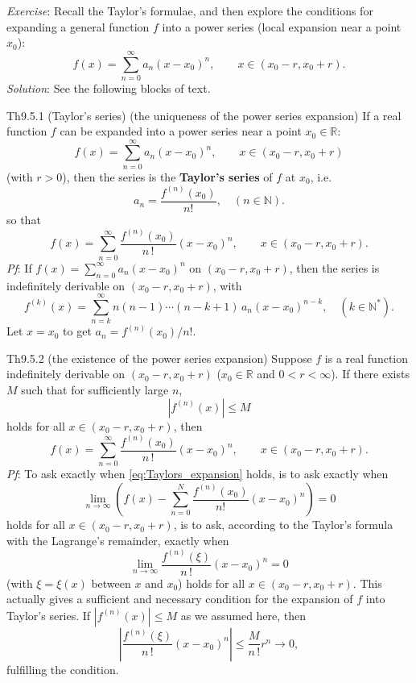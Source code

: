 \documentclass{article}
\begin{document}
\begin{Rmk}{}
    \textit{Exercise}: Recall the Taylor's formulae, and then explore the conditions for expanding a general function $f$ into a power series (local expansion near a point $x_0$):
    $$ f(x) = \sum_{n=0}^{\infty} a_n (x - x_0)^n, \qquad x\in (x_0 - r, x_0 + r). $$
    \tcblower
    \textit{Solution}: See the following blocks of text.
\end{Rmk}

\begin{Th}{Th9.5.1 (Taylor's series) (the uniqueness of the power series expansion)}
    If a real function $f$ \textcolor{Df}{can be expanded into a power series near a point $x_0\in\mathbb{R}$:
    $$ f(x) = \sum_{n=0}^{\infty} a_n (x - x_0)^n, \qquad x\in (x_0 - r, x_0 + r) $$
    (with $r>0$),} then the series is the \textcolor{Df}{\textbf{Taylor's series} of $f$ at $x_0$, i.e.
    $$ a_n = \frac{f^{(n)}(x_0)}{n!}, \quad (n\in\mathbb{N}). $$} 
    so that
    $$ f(x) = \sum_{n=0}^{\infty} \frac{f^{(n)}(x_0)}{n\,!} (x - x_0)^n, \qquad x\in (x_0 - r, x_0 + r). $$
    \tcblower
    \textit{Pf}: If $f(x) = \sum_{n=0}^{\infty} a_n (x - x_0)^n$ on $(x_0 - r, x_0 + r)$, then the series is indefinitely derivable on $(x_0 - r, x_0 + r)$, with
    $$ f^{(k)}(x) = \sum_{n=k}^{\infty} n(n-1)\cdots(n-k+1)\, a_n (x - x_0)^{n-k}, \quad (k\in\mathbb{N}^\ast). $$
    Let $x = x_0$ to get $a_n = f^{(n)}(x_0)/n!$.
\end{Th}

\begin{Th}{Th9.5.2 (the existence of the power series expansion)}
    Suppose $f$ is a real function indefinitely derivable on $(x_0 - r, x_0 + r)$ ($x_0\in\mathbb{R}$ and $0<r<\infty$). If there exists $M$ such that for sufficiently large $n$,
    $$ |f^{(n)}(x)| \leq M $$
    holds for all $x\in (x_0 - r, x_0 + r)$, then
    \begin{equation}
        f(x) = \sum_{n=0}^{\infty} \frac{f^{(n)}(x_0)}{n\,!} (x - x_0)^n, \qquad x\in (x_0 - r, x_0 + r). 
        \label{eq:Taylors_expansion}
    \end{equation}
    \tcblower
    \textit{Pf}: To ask exactly when \eqref{eq:Taylors_expansion} holds, is to ask exactly when
    $$ \lim\limits_{n\to\infty} \left(f(x) - \sum_{n=0}^{N} \frac{f^{(n)}(x_0)}{n!} (x - x_0)^n \right) = 0 $$
    holds for all $x\in (x_0 - r, x_0 + r)$, is to ask, according to the Taylor's formula with the Lagrange's remainder, exactly when
    $$ \lim\limits_{n\to\infty} \frac{f^{(n)}(\xi)}{n\, !} (x - x_0)^n = 0 $$
    (with $\xi = \xi (x)$ between $x$ and $x_0$) holds for all $x\in (x_0 - r, x_0 + r)$.
    \textcolor{Th}{This actually gives a sufficient and necessary condition for the expansion of $f$ into Taylor's series.} If $|f^{(n)}(x)| \leq M$ as we assumed here, then
    $$ \left|\frac{f^{(n)}(\xi)}{n\, !} (x - x_0)^n\right| \leq \frac{M}{n\,!} r^n \to 0, $$
    fulfilling the condition.
\end{Th}
\end{document}
